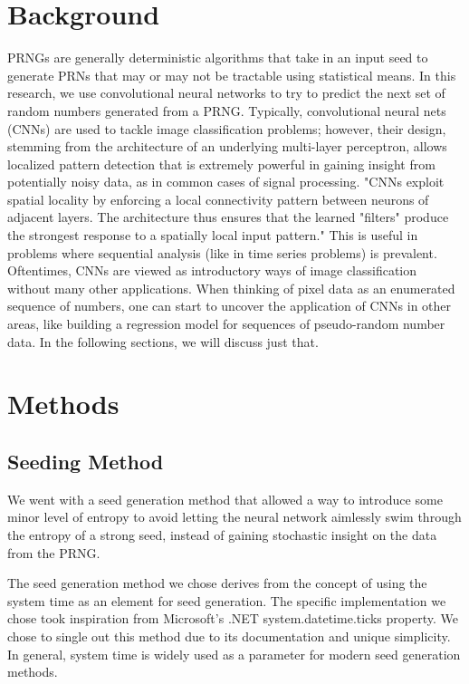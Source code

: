 \documentclass[conference]{IEEEtran}
\begin{document}
\section{Background}
PRNGs are generally deterministic algorithms that take in an input seed to generate PRNs that may or may not be tractable using statistical means. In this research, we use convolutional neural networks to try to predict the next set of random numbers generated from a PRNG. 
Typically, convolutional neural nets (CNNs) are used to tackle image classification problems; however, their design, stemming from the architecture of an underlying multi-layer perceptron, allows localized pattern detection that is extremely powerful in gaining insight from potentially noisy data, as in common cases of signal processing.\cite{Markell94}
"CNNs exploit spatial locality by enforcing a local connectivity pattern between neurons of adjacent layers. The architecture thus ensures that the learned "filters" produce the strongest response to a spatially local input pattern." \cite{CNN}
This is useful in problems where sequential analysis (like in time series problems) is prevalent. Oftentimes, CNNs are viewed as introductory ways of image classification without many other applications. When thinking of pixel data as an enumerated sequence of numbers, one can start to uncover the application of CNNs in other areas, like building a regression model for sequences of pseudo-random number data.
In the following sections, we will discuss just that.

\section{Methods}
\subsection{Seeding Method}
We went with a seed generation method that allowed a way to introduce some minor level of entropy to avoid letting the neural network aimlessly swim through the entropy of a strong seed, instead of gaining stochastic insight on the data from the PRNG.

The seed generation method we chose derives from the concept of using the system time as an element for seed generation. The specific implementation we chose took inspiration from Microsoft's .NET system.datetime.ticks property. \cite{msoftdocs} We chose to single out this method due to its documentation and unique simplicity. In general, system time is widely used as a parameter for modern seed generation methods. 
\end{document}
